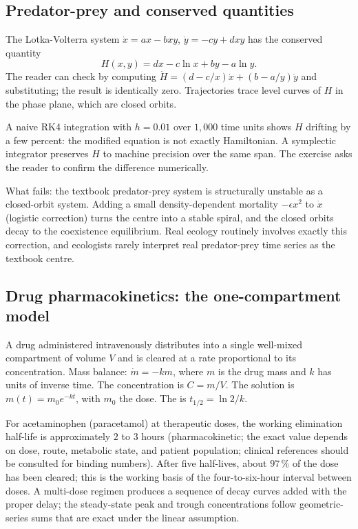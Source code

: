 

\subsection{Predator-prey and conserved quantities}

The Lotka-Volterra system $\dot{x} = a x - b x y$, $\dot{y} = -c y
+ d x y$ has the conserved quantity
\[
H(x, y) = d x - c \ln x + b y - a \ln y.
\]
The reader can check by computing $\dot{H} = (d - c/x)\dot{x} +
(b - a/y)\dot{y}$ and substituting; the result is identically
zero. Trajectories trace level curves of $H$ in the phase plane,
which are closed orbits.

A naive RK4 integration with $h = 0.01$ over $1{,}000$ time units
shows $H$ drifting by a few percent: the modified equation is not
exactly Hamiltonian. A symplectic integrator preserves $H$ to
machine precision over the same span. The exercise asks the reader
to confirm the difference numerically.

What fails: the textbook predator-prey system is structurally
unstable as a closed-orbit system. Adding a small density-dependent
mortality $-\epsilon x^{2}$ to $\dot{x}$ (logistic correction)
turns the centre into a stable spiral, and the closed orbits decay
to the coexistence equilibrium. Real ecology routinely involves
exactly this correction, and ecologists rarely interpret real
predator-prey time series as the textbook centre.

\subsection{Drug pharmacokinetics: the one-compartment model}

A drug administered intravenously distributes into a single
well-mixed compartment of volume $V$ and is cleared at a rate
proportional to its concentration. Mass balance:
$\dot{m} = -k m$, where $m$ is the drug mass and $k$ has units of
inverse time. The concentration is $C = m/V$. The solution is
$m(t) = m_{0} e^{-k t}$, with $m_{0}$ the dose. The
 is $t_{1/2} = \ln 2 / k$.

For acetaminophen (paracetamol) at therapeutic doses, the working
elimination half-life is approximately $2$ to $3$ hours
(pharmacokinetic; the exact value depends on dose, route,
metabolic state, and patient population; clinical references
should be consulted for binding numbers). After five half-lives,
about $97\,\%$ of the dose has been cleared; this is the working
basis of the four-to-six-hour interval between doses. A multi-dose
regimen produces a sequence of decay curves added with the proper
delay; the steady-state peak and trough concentrations follow
geometric-series sums that are exact under the linear assumption.

